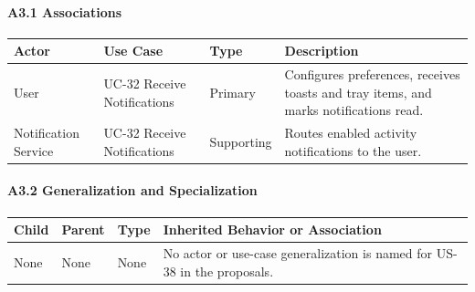 \documentclass[12pt]{article}
\renewcommand{\baselinestretch}{1.5}
\begin{document}
\hypertarget{sec:a3-1-associations}{}
\paragraph*{A3.1 Associations}
\par\medskip

\begingroup
\small
\renewcommand{\baselinestretch}{1.0}\selectfont
\renewcommand{\arraystretch}{1.15}
\setlength{\tabcolsep}{6pt}
\begin{longtable}{|>{\raggedright\arraybackslash}p{}|>{\raggedright\arraybackslash}p{}|>{\raggedright\arraybackslash}p{}|>{\raggedright\arraybackslash}p{}|}
\hline
\textbf{Actor} & \textbf{Use Case} & \textbf{Type} & \textbf{Description} \\ \hline
\endhead
User & UC-32 Receive Notifications & Primary & Configures preferences, receives toasts and tray items, and marks notifications read. \\ \hline
Notification Service & UC-32 Receive Notifications & Supporting & Routes enabled activity notifications to the user. \\ \hline
\end{longtable}
\endgroup
\par\medskip

\hypertarget{sec:a3-2-generalization-and-specialization}{}
\paragraph*{A3.2 Generalization and Specialization}
\par\medskip

\begingroup
\small
\renewcommand{\baselinestretch}{1.0}\selectfont
\renewcommand{\arraystretch}{1.15}
\setlength{\tabcolsep}{6pt}
\begin{longtable}{|>{\raggedright\arraybackslash}p{}|>{\raggedright\arraybackslash}p{}|>{\raggedright\arraybackslash}p{}|>{\raggedright\arraybackslash}p{}|}
\hline
\textbf{Child} & \textbf{Parent} & \textbf{Type} & \textbf{Inherited Behavior or Association} \\ \hline
\endhead
None & None & None & No actor or use-case generalization is named for US-38 in the proposals. \\ \hline
\end{longtable}
\endgroup
\par\medskip

\hypertarget{sec:a3-3-include}{}
\end{document}
